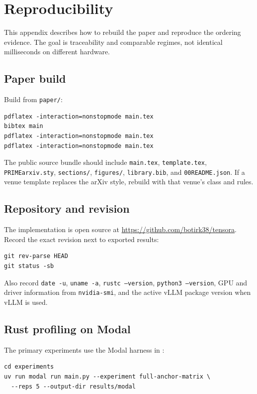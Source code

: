 \section{Reproducibility}
\label{app:repro}

This appendix describes how to rebuild the paper and reproduce the ordering evidence. The goal is traceability and comparable regimes, not identical milliseconds on different hardware.

\subsection{Paper build}

Build from \texttt{paper/}:

\begin{verbatim}
pdflatex -interaction=nonstopmode main.tex
bibtex main
pdflatex -interaction=nonstopmode main.tex
pdflatex -interaction=nonstopmode main.tex
\end{verbatim}

The public source bundle should include \texttt{main.tex}, \texttt{template.tex}, \texttt{PRIMEarxiv.sty}, \texttt{sections/}, \texttt{figures/}, \texttt{library.bib}, and \texttt{00README.json}. If a venue template replaces the arXiv style, rebuild with that venue's class and rules.

\subsection{Repository and revision}

The implementation is open source at \url{https://github.com/botirk38/tensora}. Record the exact revision next to exported results:

\begin{verbatim}
git rev-parse HEAD
git status -sb
\end{verbatim}

Also record \texttt{date -u}, \texttt{uname -a}, \texttt{rustc --version}, \texttt{python3 --version}, GPU and driver information from \texttt{nvidia-smi}, and the active vLLM package version when vLLM is used.

\subsection{Rust profiling on Modal}

The primary experiments use the Modal harness in :

\begin{verbatim}
cd experiments
uv run modal run main.py --experiment full-anchor-matrix \
  --reps 5 --output-dir results/modal
\end{verbatim}

